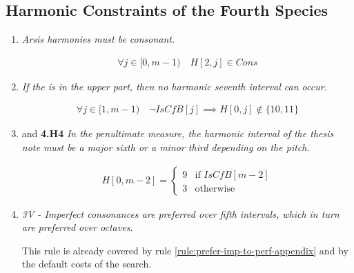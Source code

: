 \subsection*{Harmonic Constraints of the Fourth Species}
\begin{enumerate}[wide, label=\bfseries 4.H\arabic*]
  \item\label{rule:arsiscons} {\textit{Arsis harmonies must be consonant.}}

\begin{equation}
    \begin{gathered}
        \forall j \in [0, m-1) \quad
        H[2, j] \in Cons
    \end{gathered}
    \label{eq:arsiscons}
\end{equation}

\item\label{rule:noseventh} {\textit{If the \cfs is in the upper part, then no harmonic seventh interval can occur.}}

\begin{equation}
    \begin{gathered}
        \forall j \in [1, m-1) \quad
        \lnot \mathit{IsCfB}[j] \implies H[0, j] \notin \{10, 11\}
    \end{gathered}
\end{equation}

\item\label{rule:lowpenult4th} \label{rule:uppenult4th} {and \textbf{4.H4} \textit{In the penultimate measure, the harmonic interval of the thesis note must be a major sixth or a minor third depending on the \cfs pitch.}}

\begin{equation}
    \begin{gathered}
        H[0, m-2] = \begin{cases}
            9 & \text{if } \mathit{IsCfB}[m-2]\\
            3 & \text{otherwise}
        \end{cases}
    \end{gathered}
\end{equation}

\item \textit{3V - Imperfect consonances are preferred over fifth intervals, which in turn are preferred over octaves.}   

    This rule is already covered by rule \ref{rule:prefer-imp-to-perf-appendix} and by the default costs of the search.
\end{enumerate}
